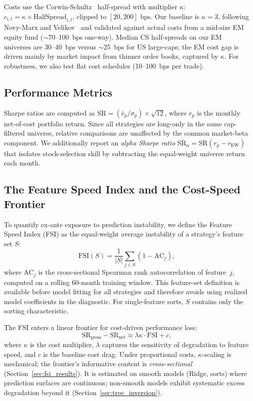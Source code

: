 \documentclass[sigconf,balance=false]{acmart}
\begin{document}
Costs use the Corwin-Schultz~\cite{corwinschultz2012} half-spread with
multiplier $\kappa$: $c_{i,t} = \kappa \times \text{HalfSpread}_{i,t}$,
clipped to $[20, 200]$ bps. Our baseline is $\kappa = 3$, following
Novy-Marx and Velikov~\cite{novymarx2016taxonomy} and validated against
actual costs from a mid-size EM equity fund (${\sim}$70--100~bps one-way).
Median CS half-spreads on our EM universes are 30--40~bps versus
${\sim}$25~bps for US large-caps; the EM cost gap is driven mainly by
market impact from thinner order books, captured by $\kappa$. For
robustness, we also test flat cost schedules (10--100~bps per trade).

\subsection{Performance Metrics}

Sharpe ratios are computed as $\text{SR} = (\bar{r}_p / \sigma_p)
\times \sqrt{12}$, where $r_p$ is the monthly net-of-cost portfolio
return. Since all strategies are long-only in the same cap-filtered
universe, relative comparisons are unaffected by the common
market-beta component. We additionally report an \emph{alpha Sharpe
ratio} $\text{SR}_\alpha = \text{SR}(r_p - r_{\text{EW}})$ that
isolates stock-selection skill by subtracting the equal-weight universe
return each month.

\subsection{The Feature Speed Index and the Cost-Speed Frontier}
\label{sec:fsi_method}

To quantify ex-ante exposure to prediction instability, we define the
Feature Speed Index (FSI) as the equal-weight average instability of a
strategy's feature set $S$:
\begin{equation}
    \text{FSI}(S) = \frac{1}{|S|}\sum_{j \in S} (1 - \text{AC}_j),
\label{eq:fsi}
\end{equation}
where $\text{AC}_j$ is the cross-sectional Spearman rank autocorrelation
of feature~$j$, computed on a rolling 60-month training window. This
feature-set definition is available before model fitting for all strategies
and therefore avoids using realized model coefficients in the diagnostic.
For single-feature sorts, $S$ contains only the sorting characteristic.

The FSI enters a linear frontier for cost-driven performance loss:
\begin{equation}
    \text{SR}_{\text{gross}} - \text{SR}_{\text{net}}
    \approx \lambda\kappa \cdot \text{FSI} + c,
\label{eq:bound}
\end{equation}
where $\kappa$ is the cost multiplier, $\lambda$ captures the
sensitivity of degradation to feature speed, and $c$ is the baseline
cost drag. Under proportional costs, $\kappa$-scaling is mechanical;
the frontier's informative content is \emph{cross-sectional}
(Section~\ref{sec:fsi_results}). It is estimated
on smooth models (Ridge, sorts) where prediction surfaces
are continuous; non-smooth models exhibit systematic excess
degradation beyond it (Section~\ref{sec:tree_inversion}).
\end{document}
